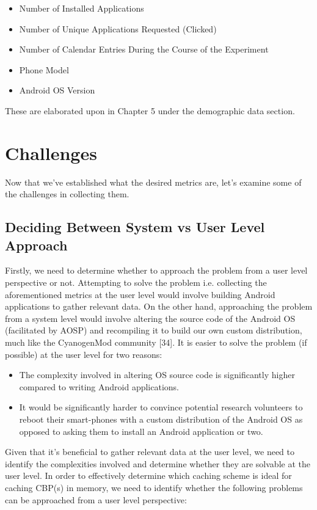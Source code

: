 \documentclass[12pt]{uthesis-v12}  %
\begin{document}
			\begin{itemize}
				\item Number of Installed Applications
				\item Number of Unique Applications Requested (Clicked)
				\item Number of Calendar Entries During the Course of the Experiment
				\item Phone Model
				\item Android OS Version
			\end{itemize} 
			
			These are elaborated upon in Chapter 5 under the demographic data section.   
			
	\section{Challenges}
		Now that we've established what the desired metrics are, let's examine some of the challenges in collecting them.  
		
		\subsection{Deciding Between System vs User Level Approach}
			Firstly, we need to determine whether to approach the problem from a user level perspective or not. Attempting to solve the problem i.e. collecting the aforementioned metrics at the user level would involve building Android applications to gather relevant data. On the other hand, approaching the problem from a system level would involve altering the source code of the Android OS (facilitated by AOSP) and recompiling it to build our own custom distribution, much like the CyanogenMod community [34]. It is easier to solve the problem (if possible) at the user level for two reasons:
			
			\begin{itemize}
				\item The complexity involved in altering OS source code is significantly higher compared to writing Android applications.
				\item It would be significantly harder to convince potential research volunteers to reboot their smart-phones with a custom distribution of the Android OS as opposed to asking them to install an Android application or two.
			\end{itemize}
			
			Given that it's beneficial to gather relevant data at the user level, we need to identify the complexities involved and determine whether they are solvable at the user level. In order to effectively determine which caching scheme is ideal for caching CBP(s) in memory, we need to identify whether the following problems can be approached from a user level perspective:
			
\end{document}
